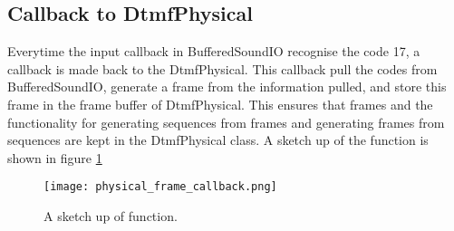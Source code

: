 	\subsection{Callback to DtmfPhysical}
	Everytime the input callback in BufferedSoundIO recognise the code 17, a callback is made back to the DtmfPhysical. This callback pull the
	codes from BufferedSoundIO, generate a frame from the information pulled, and store this frame in the frame buffer of DtmfPhysical. This ensures
	that frames and the functionality for generating sequences from frames and generating frames from sequences are kept in the DtmfPhysical class.
	A sketch up of the function is shown in figure \ref{fig:physical_frame_callback}
	
	\begin{figure}[htb]
		\begin{center}
		\texttt{[image: physical\_frame\_callback.png]}%
		\caption{A sketch up of  function.}
		\label{fig:physical_frame_callback}
		\end{center}
	\end{figure}
